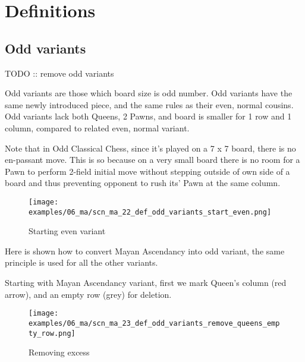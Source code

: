 

\chapter*{Definitions}
\label{ch:Definitions}

\section*{Odd variants}
\label{sec:Definitions/Odd variants}

\huge{TODO :: remove odd variants}
\normalsize{}

Odd variants are those which board size is odd number. Odd variants
have the same newly introduced piece, and the same rules as their
even, normal cousins. Odd variants lack both Queens, 2 Pawns, and
board is smaller for 1 row and 1 column, compared to related even,
normal variant.

Note that in Odd Classical Chess, since it's played on a 7 x 7 board,
there is no en-passant move. This is so because on a very small board
there is no room for a Pawn to perform 2-field initial move without
stepping outside of own side of a board and thus preventing opponent
to rush its' Pawn at the same column.

\clearpage %

\noindent
\begin{figure}[!h]
\texttt{[image: examples/06\_ma/scn\_ma\_22\_def\_odd\_variants\_start\_even.png]}
\caption{Starting even variant}
\label{fig:scn_ma_22_def_odd_variants_start_even}
\end{figure}

Here is shown how to convert Mayan Ascendancy into odd variant,
the same principle is used for all the other variants.

Starting with Mayan Ascendancy variant, first we mark Queen's column
(red arrow), and an empty row (grey) for deletion.

\clearpage %

\noindent
\begin{figure}[!h]
\texttt{[image: examples/06\_ma/scn\_ma\_23\_def\_odd\_variants\_remove\_queens\_empty\_row.png]}
\caption{Removing excess}
\label{fig:scn_ma_23_def_odd_variants_remove_queens_empty_row}
\end{figure}

